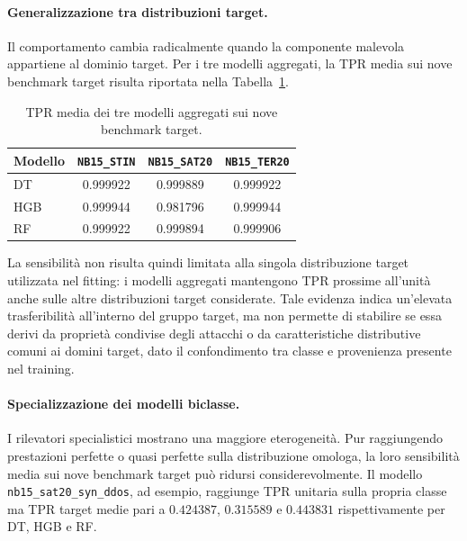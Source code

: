 \paragraph{Generalizzazione tra distribuzioni target.}
Il comportamento cambia radicalmente quando la componente malevola appartiene al dominio target. 
Per i tre modelli aggregati, la TPR media sui nove benchmark target risulta riportata nella Tabella~\ref{tab:tpr_media_target_aggregati}.

\begin{table}[H]
    \centering
    \small
    \caption{TPR media dei tre modelli aggregati sui nove benchmark target.}
    \label{tab:tpr_media_target_aggregati}
    \begin{tabular}{lccc}
        \toprule
        \textbf{Modello} & \textbf{\texttt{NB15\_STIN}} & \textbf{\texttt{NB15\_SAT20}} & \textbf{\texttt{NB15\_TER20}} \\
        \midrule
        DT  & 0.999922 & 0.999889 & 0.999922 \\
        HGB & 0.999944 & 0.981796 & 0.999944 \\
        RF  & 0.999922 & 0.999894 & 0.999906 \\
        \bottomrule
    \end{tabular}
\end{table}

La sensibilità non risulta quindi limitata alla singola distribuzione target utilizzata nel fitting: i modelli aggregati mantengono TPR prossime all'unità anche sulle altre distribuzioni target considerate. 
Tale evidenza indica un'elevata trasferibilità all'interno del gruppo target, ma non permette di stabilire se essa derivi da proprietà condivise degli attacchi o da caratteristiche distributive comuni ai domini target, dato il confondimento tra classe e provenienza presente nel training.

\paragraph{Specializzazione dei modelli biclasse.} I rilevatori specialistici mostrano una maggiore eterogeneità. 
Pur raggiungendo prestazioni perfette o quasi perfette sulla distribuzione omologa, la loro sensibilità media sui nove benchmark target può ridursi considerevolmente. 
Il modello \texttt{nb15\_sat20\_syn\_ddos}, ad esempio, raggiunge TPR unitaria sulla propria classe ma TPR target medie pari a $0.424387$, $0.315589$ e $0.443831$ rispettivamente per DT, HGB e RF.

